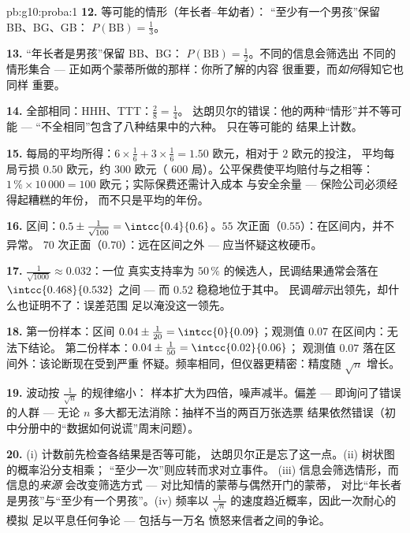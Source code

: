 \begin{solution}{pb:g10:proba:1}
\textbf{12.} 等可能的情形（年长者--年幼者）：
“至少有一个男孩”保留 BB、BG、GB：
$P(\text{BB}) = \frac13$。

\textbf{13.} “年长者是男孩”保留 BB、BG：
$P(\text{BB}) = \frac12$。不同的信息会筛选出
不同的情形集合 --- 正如两个蒙蒂所做的那样：你所了解的内容
很重要，而\emph{如何}得知它也同样
重要。

\textbf{14.} 全部相同：HHH、TTT：$\frac28 = \frac14$。
达朗贝尔的错误：他的两种“情形”并不等可能
--- “不全相同”包含了八种结果中的六种。
 只在等可能的
结果上计数。

\textbf{15.} 每局的平均所得：$6 \times \frac16 + 3
\times \frac16 = 1.50$ 欧元，相对于 $2$ 欧元的投注，
平均每局亏损 $0.50$ 欧元，约 $300$ 欧元（
$600$ 局）。公平保费使平均赔付与之相等：
$1\,\% \times 10\,000 = 100$ 欧元；实际保费还需计入成本
与安全余量 --- 保险公司必须经得起糟糕的年份，
而不只是平均的年份。

\textbf{16.} 区间：$0.5 \pm \frac{1}{\sqrt{100}} =
\intcc{0.4}{0.6}$。$55$ 次正面（$0.55$）：在区间内，并不异常。
$70$ 次正面（$0.70$）：远在区间之外 --- 应当怀疑这枚硬币。

\textbf{17.} $\frac{1}{\sqrt{1000}} \approx 0.032$：一位
真实支持率为 $50\,\%$ 的候选人，民调结果通常会落在
$\intcc{0.468}{0.532}$ 之间 --- 而 $0.52$ 稳稳地位于其中。
民调\emph{暗示}出领先，却什么也证明不了：误差范围
足以淹没这一领先。

\textbf{18.} 第一份样本：区间 $0.04 \pm \frac{1}{20} =
\intcc{0}{0.09}$；观测值 $0.07$ 在区间内：无法下结论。
第二份样本：$0.04 \pm \frac{1}{50} = \intcc{0.02}{0.06}$；
观测值 $0.07$ 落在区间外：该论断现在受到严重
怀疑。频率相同，但仪器更精密：精度随
$\sqrt n$ 增长。

\textbf{19.} 波动按 $\frac{1}{\sqrt n}$ 的规律缩小：
样本扩大为四倍，噪声减半。偏差 --- 即询问了错误的人群 ---
无论 $n$ 多大都无法消除：抽样不当的两百万张选票
结果依然错误（初中分册中的“数据如何说谎”周末问题）。

\textbf{20.} (i) 计数前先检查各结果是否等可能，
达朗贝尔正是忘了这一点。(ii) 树状图的概率沿分支相乘；
“至少一次”则应转而求对立事件。
(iii) 信息会筛选情形，而信息的\emph{来源}
会改变筛选方式 --- 对比知情的蒙蒂与偶然开门的蒙蒂，
对比“年长者是男孩”与“至少有一个男孩”。(iv) 频率以
$\frac{1}{\sqrt n}$ 的速度趋近概率，因此一次耐心的模拟
足以平息任何争论 --- 包括与一万名
愤怒来信者之间的争论。
\end{solution}
